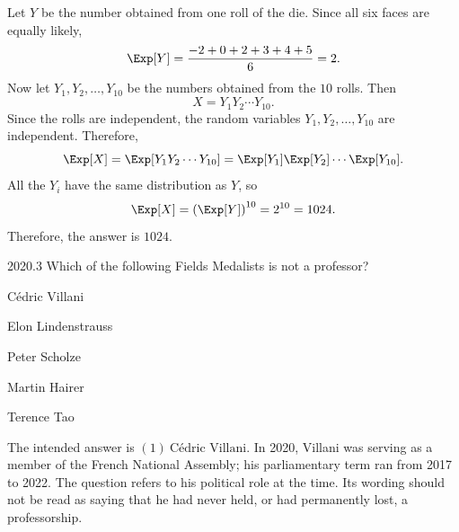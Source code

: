     \begin{solution}
        Let $Y$ be the number obtained from one roll of the die. Since all six faces are equally
        likely,
        \[
            \Exp[Y]
            =
            \frac{-2+0+2+3+4+5}{6}
            =
            2.
        \]
        Now let $Y_1,Y_2,\dots,Y_{10}$ be the numbers obtained from the $10$ rolls. Then
        \[
            X=Y_1Y_2\cdots Y_{10}.
        \]
        Since the rolls are independent, the random variables $Y_1,Y_2,\dots,Y_{10}$ are
        independent. Therefore,
        \[
            \Exp[X]
            =
            \Exp[Y_1Y_2\cdots Y_{10}]
            =
            \Exp[Y_1]\Exp[Y_2]\cdots\Exp[Y_{10}].
        \]
        All the $Y_i$ have the same distribution as $Y$, so
        \[
            \Exp[X]
            =
            \left(\Exp[Y]\right)^{10}
            =
            2^{10}
            =
            1024.
        \]
        Therefore, the answer is $\boxed{1024}$.
    \end{solution}

    \begin{pastproblem}{2020.3}
        Which of the following Fields Medalists is not a professor?
        \begin{problemchoices}
            \item Cédric Villani
            \item Elon Lindenstrauss
            \item Peter Scholze
            \item Martin Hairer
            \item Terence Tao
        \end{problemchoices}
    \end{pastproblem}

    \begin{solution}
The intended answer is $\boxed{(1)\ \text{C\'edric Villani}}$.
        In 2020, Villani was serving as a member of the French National Assembly;
        his parliamentary term ran from 2017 to 2022. The question refers to his
        political role at the time. Its wording should not be read as saying
        that he had never held, or had permanently lost, a professorship.
    \end{solution}

